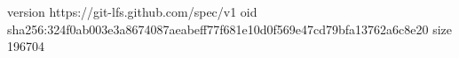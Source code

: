 version https://git-lfs.github.com/spec/v1
oid sha256:324f0ab003e3a8674087aeabeff77f681e10d0f569e47cd79bfa13762a6c8e20
size 196704
